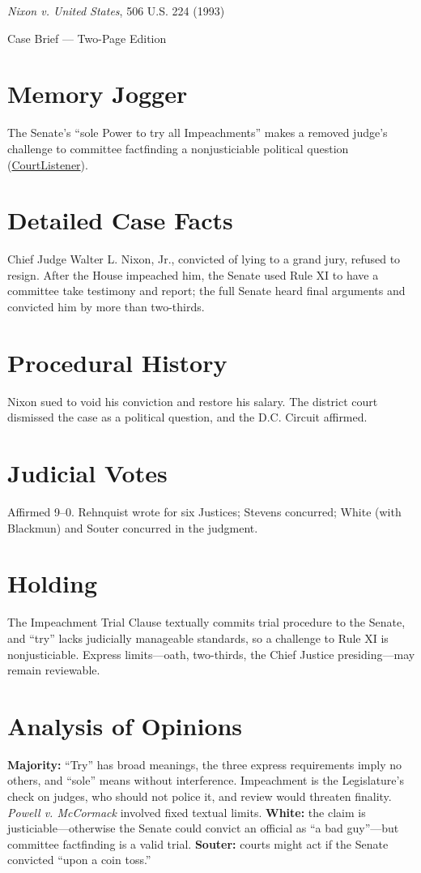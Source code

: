 \documentclass[12pt]{article}
\begin{document}
\begin{center}
{\LARGE \textit{Nixon v. United States}, 506 U.S. 224 (1993)\par}
\vspace{0.5em}
{\large Case Brief --- Two-Page Edition\par}
\end{center}

\section{Memory Jogger}
The Senate's ``sole Power to try all Impeachments'' makes a removed judge's challenge to committee factfinding a nonjusticiable political question (\href{https://www.courtlistener.com/opinion/112803/nixon-v-united-states/}{CourtListener}).

\section{Detailed Case Facts}
Chief Judge Walter L. Nixon, Jr., convicted of lying to a grand jury, refused to resign. After the House impeached him, the Senate used Rule XI to have a committee take testimony and report; the full Senate heard final arguments and convicted him by more than two-thirds.

\section{Procedural History}
Nixon sued to void his conviction and restore his salary. The district court dismissed the case as a political question, and the D.C. Circuit affirmed.

\section{Judicial Votes}
Affirmed 9--0. Rehnquist wrote for six Justices; Stevens concurred; White (with Blackmun) and Souter concurred in the judgment.

\section{Holding}
The Impeachment Trial Clause textually commits trial procedure to the Senate, and ``try'' lacks judicially manageable standards, so a challenge to Rule XI is nonjusticiable. Express limits---oath, two-thirds, the Chief Justice presiding---may remain reviewable.

\section{Analysis of Opinions}
\textbf{Majority:} ``Try'' has broad meanings, the three express requirements imply no others, and ``sole'' means without interference. Impeachment is the Legislature's check on judges, who should not police it, and review would threaten finality. \textit{Powell v. McCormack} involved fixed textual limits. \textbf{White:} the claim is justiciable---otherwise the Senate could convict an official as ``a bad guy''---but committee factfinding is a valid trial. \textbf{Souter:} courts might act if the Senate convicted ``upon a coin toss.''
\end{document}
